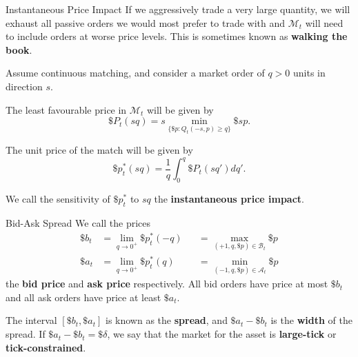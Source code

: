 \documentclass{beamer}
\begin{document}
\begin{frame}{Instantaneous Price Impact}
	If we aggressively trade a very large quantity, we will exhaust all passive orders we would most prefer to trade with and $\mathcal{M}_t$ will need to include orders at worse price levels. This is sometimes known as \textbf{walking the book}.

	\pause

	Assume continuous matching, and consider a market order of $q>0$ units in direction $s$.

	\pause
	The least favourable price in $\mathcal{M}_t$ will be given by
	$$\$P_t(sq) = s\min_{\{\$p : Q_t(-s,p)\geq q\}} \$sp.$$

	\pause

	The unit price of the match will be given by
	$$\$p^*_t(sq) = \frac{1}{q}\int_0^q \$P_t(sq')dq'.$$

	We call the sensitivity of $\$p^*_t$ to $sq$ the \textbf{instantaneous price impact}.%
\end{frame}

\begin{frame}{Bid-Ask Spread}
	We call the prices
	\begin{align*}
		\$b_t	&= \lim_{q\to0^+} \$p^*_t(-q)	&&= \max_{(+1,q,\$p)\in\mathcal{B}_t} \$p
	\\	\$a_t	&= \lim_{q\to0^+} \$p^*_t(q)	&&= \min_{(-1,q,\$p)\in\mathcal{A}_t} \$p
	\end{align*}
	the \textbf{bid price} and \textbf{ask price} respectively. All bid orders have price at most $\$b_t$ and all ask orders have price at least $\$a_t$.%

	The interval $[\$b_t,\$a_t]$ is known as the \textbf{spread}, and $\$a_t-\$b_t$ is the \textbf{width} of the spread. If $\$a_t-\$b_t=\$\delta$, we say that the market for the asset is \textbf{large-tick} or \textbf{tick-constrained}.%

\end{frame}
\end{document}
